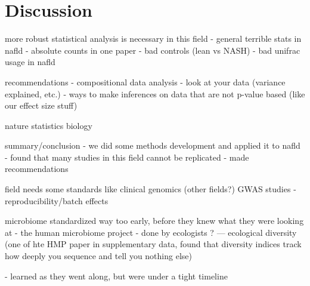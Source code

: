 \chapter{Discussion}

more robust statistical analysis is necessary in this field
- general terrible stats in nafld
   - absolute counts in one paper
  - bad controls (lean vs NASH)
- bad unifrac usage in nafld

recommendations
- compositional data analysis
- look at your data (variance explained, etc.)
- ways to make inferences on data that are not p-value based (like our effect size stuff)

nature statistics biology

summary/conclusion
- we did some methods development and applied it to nafld
- found that many studies in this field cannot be replicated
- made recommendations

field needs some standards like clinical genomics (other fields?)
GWAS studies - reproducibility/batch effects

microbiome standardized way too early, before they knew what they were looking at
- the human microbiome project
- done by ecologists ?
 — ecological diversity (one of hte HMP paper in supplementary data, found that diversity indices track how deeply you sequence and tell you nothing else)

- learned as they went along, but were under a tight timeline